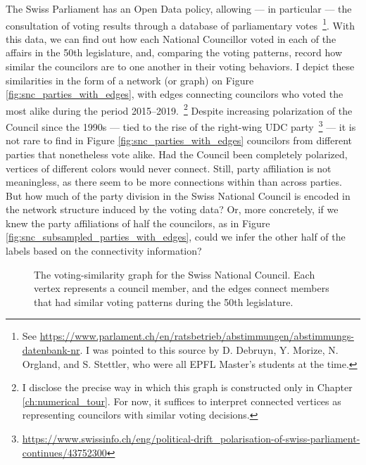 The Swiss Parliament has an Open Data policy, allowing --- in particular --- the consultation of voting results through a database of parliamentary votes~\footnote{See \url{https://www.parlament.ch/en/ratsbetrieb/abstimmungen/abstimmungs-datenbank-nr}. I was pointed to this source by  D. Debruyn, Y. Morize, N. Orgland, and S. Stettler, who were all EPFL Master's students at the time.}. With this data, we can find out how each National Councillor voted in each of the affairs in the 50th legislature, and, comparing the voting patterns, record how similar the councilors are to one another in their voting behaviors. I depict these similarities in the form of a network (or graph) on Figure \ref{fig:snc_parties_with_edges}, with edges connecting councilors who voted the most alike during the period 2015--2019.~\footnote{I disclose the precise way in which this graph is constructed only in Chapter \ref{ch:numerical_tour}. For now, it suffices to interpret connected vertices as representing councilors with similar voting decisions.} Despite increasing polarization of the Council since the 1990s --- tied to the rise of the right-wing UDC party~\footnote{\url{https://www.swissinfo.ch/eng/political-drift_polarisation-of-swiss-parliament-continues/43752300}} --- it is not rare to find in Figure \ref{fig:snc_parties_with_edges} councilors from different parties that nonetheless vote alike. Had the Council been completely polarized, vertices of different colors would never connect. Still, party affiliation is not meaningless, as there seem to be more connections within than across parties. But how much of the party division in the Swiss National Council is encoded in the network structure induced by the voting data? Or, more concretely, if we knew the party affiliations of half the councilors, as in Figure \ref{fig:snc_subsampled_parties_with_edges}, could we infer the other half of the labels based on the connectivity information?

\begin{figure}[H]
    \centering
    \hfill
    \hfill
    \hfill
    \caption[The voting-similarity graph for the Swiss National Council]{The voting-similarity graph for the Swiss National Council. Each vertex represents a council member, and the edges connect members that had similar voting patterns during the 50th legislature.}
\end{figure}

